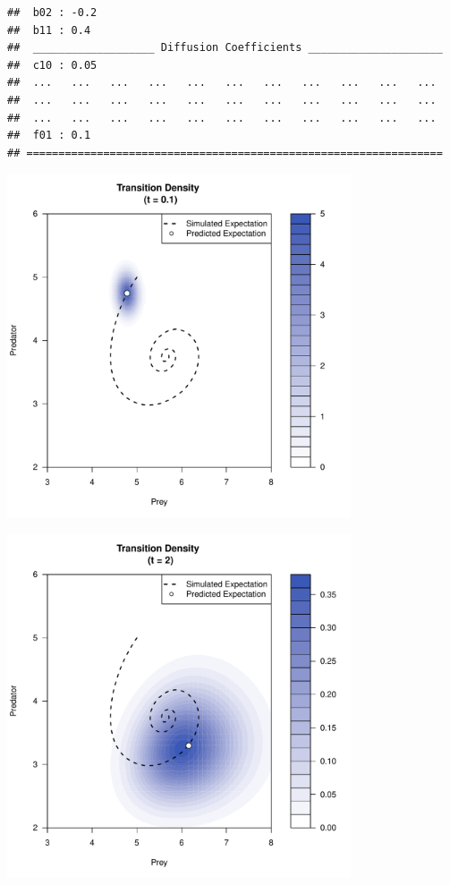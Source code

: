 \documentclass[a4paper,11pt]{article}\usepackage[]{graphicx}\usepackage[]{color}
\makeatletter
\newenvironment{kframe}{%
 \def\at@end@of@kframe{}%
 \ifinner\ifhmode%
  \def\at@end@of@kframe{\end{minipage}}%
  \begin{minipage}{\columnwidth}%
 \fi\fi%
 \def\FrameCommand##1{\hskip\@totalleftmargin \hskip-\fboxsep
 \colorbox{shadecolor}{##1}\hskip-\fboxsep
     \hskip-\linewidth \hskip-\@totalleftmargin \hskip\columnwidth}%
 \MakeFramed {\advance\hsize-\width
   \@totalleftmargin\z@ \linewidth\hsize
   \@setminipage}}%
 {\par\unskip\endMakeFramed%
 \at@end@of@kframe}
\newenvironment{knitrout}{}{} %
\makeatother
\begin{document}
\begin{knitrout}
\begin{kframe}
\begin{verbatim}
##  b02 : -0.2                                                      
##  b11 : 0.4                                                       
##  ___________________ Diffusion Coefficients _____________________
##  c10 : 0.05                                                      
##  ...   ...   ...   ...   ...   ...   ...   ...   ...   ...   ... 
##  ...   ...   ...   ...   ...   ...   ...   ...   ...   ...   ... 
##  ...   ...   ...   ...   ...   ...   ...   ...   ...   ...   ... 
##  f01 : 0.1                                                       
## =================================================================
\end{verbatim}
\end{kframe}
\end{knitrout}

\begin{knitrout}
\color{fgcolor}\begin{kframe}


{\ttfamily\noindent\itshape\color{messagecolor}{\#\# Loading required package: methods}}\end{kframe}
\includegraphics[width=4in,height=4in]{figure/GQD-coupledPlot-1} 

\includegraphics[width=4in,height=4in]{figure/GQD-coupledPlot-2} 


\end{knitrout}
\end{document}
